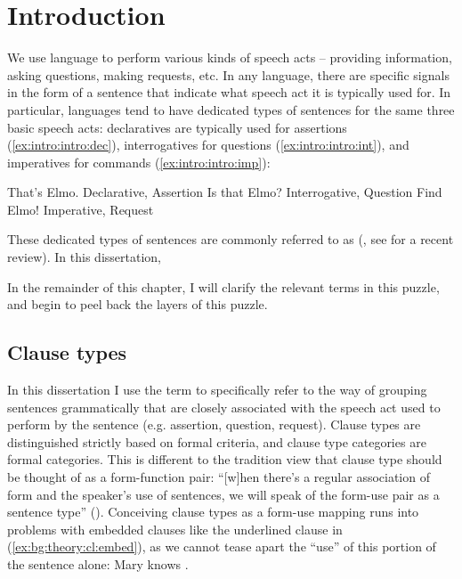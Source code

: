 

\chapter{Introduction}
\label{chap:introduction}
We use language to perform various kinds of speech acts -- providing information, asking questions, making requests, etc. In any language, there are specific signals in the form of a sentence that indicate what speech act it is typically used for. In particular, languages tend to have dedicated types of sentences for the same three basic speech acts: declaratives are typically used for assertions (\ref{ex:intro:intro:dec}), interrogatives for questions (\ref{ex:intro:intro:int}), and imperatives for commands (\ref{ex:intro:intro:imp}):

\bxl \label{ex:intro:intro:dec}
That's Elmo. \hfill Declarative, Assertion
\ex\label{ex:intro:intro:int} Is that Elmo? \hfill Interrogative, Question
\ex\label{ex:intro:intro:imp} Find Elmo! \hfill Imperative, Request
\exl
\eex


These dedicated types of sentences are commonly referred to as  (\citealt{sz1985speechact, konig2007, aikhenvald2016, portner2018}, see \cite{konig2020} for a recent review). In this dissertation, %

In the remainder of this chapter, I will clarify the relevant terms in this puzzle, and begin to peel back the layers of this puzzle.

\section{Clause types}
\label{sec:bg:theory:clause}

 In this dissertation I use the term to specifically refer to the way of grouping sentences grammatically that are closely associated with the speech act used to perform by the sentence (e.g. assertion, question, request). Clause types are distinguished strictly based on formal criteria, and clause type categories are formal categories. This is different to the tradition view that clause type should be thought of as a form-function pair: ``[w]hen there's a regular association of form and the speaker's use of sentences, we will speak of the form-use pair as a sentence type'' (\cite[p.156]{sz1985speechact}). Conceiving clause types as a form-use mapping runs into problems with embedded clauses like the underlined clause in (\ref{ex:bg:theory:cl:embed}), as we cannot tease apart the ``use'' of  this portion of the sentence alone:
Mary knows .
\eex


